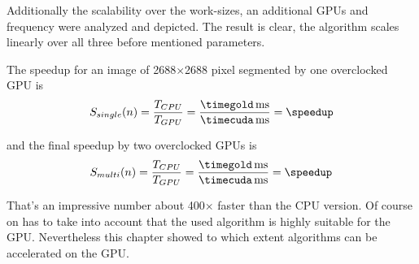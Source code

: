 Additionally the scalability over the work-sizes, an additional \glspl{GPU} and
frequency were analyzed and depicted. The result is clear, the algorithm scales
linearly over all three before mentioned parameters. 

\fpDiv{\speedup}{\timegold}{\timecuda}

The speedup for an image of 2688$\times$2688 pixel segmented by one
overclocked \gls{GPU} is 
\begin{equation}\label{eq:final_speedup_single}
 S_{single}(n) = \frac{T_{CPU}}{T_{GPU}} = \frac{\unit[\timegold]{ms}}{\unit[\timecuda]{ms}} = \speedup
\end{equation}

\fpDiv{\speedup}{\timegold}{\timecuda}

and the final speedup by two overclocked \glspl{GPU} is
\begin{equation}\label{eq:final_speedup_multi}
 S_{multi}(n) = \frac{T_{CPU}}{T_{GPU}} = \frac{\unit[\timegold]{ms}}{\unit[\timecuda]{ms}} = \speedup
\end{equation}

That's an impressive number about 400$\times$ faster than the \gls{CPU} version. 
Of course on has to take into account that the used algorithm is highly suitable
for the \gls{GPU}. Nevertheless this chapter showed to which extent algorithms 
can be accelerated on the \gls{GPU}.



